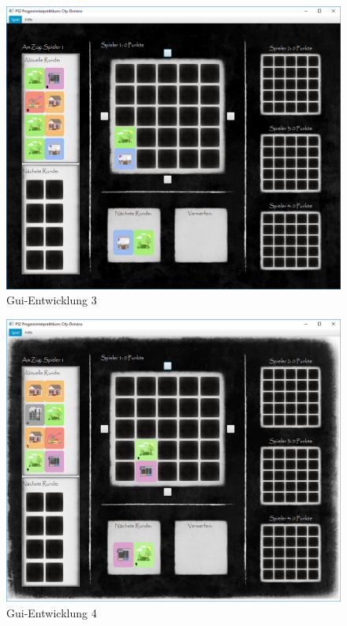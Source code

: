 \begin{figure}
	\centering
	\includegraphics[width=0.75\linewidth]{anhang/pics/220918}
	\caption{Gui-Entwicklung 3}
	\label{fig:guiEnwicklung3}
\end{figure}

\begin{figure}
	\centering
	\includegraphics[width=0.75\linewidth]{anhang/pics/220918V2}
	\caption{Gui-Entwicklung 4}
	\label{fig:guiEnwicklung4}
\end{figure}

